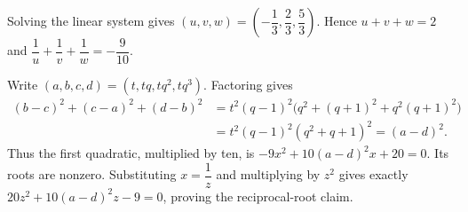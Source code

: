 Solving the linear system gives $(u,v,w)=(-\dfrac{1}{3},\dfrac{2}{3},\dfrac{5}{3})$. Hence $u+v+w=2$ and $\dfrac{1}{u}+\dfrac{1}{v}+\dfrac{1}{w}=-\dfrac{9}{10}$.

Write $(a,b,c,d)=(t,tq,tq^2,tq^3)$. Factoring gives
\[
\begin{aligned}
(b-c)^2+(c-a)^2+(d-b)^2
&=t^2(q-1)^2\bigl(q^2+(q+1)^2+q^2(q+1)^2\bigr)\\
&=t^2(q-1)^2(q^2+q+1)^2=(a-d)^2.
\end{aligned}
\]
Thus the first quadratic, multiplied by ten, is $-9x^2+10(a-d)^2x+20=0$. Its roots are nonzero. Substituting $x=\dfrac{1}{z}$ and multiplying by $z^2$ gives exactly $20z^2+10(a-d)^2z-9=0$, proving the reciprocal-root claim.
